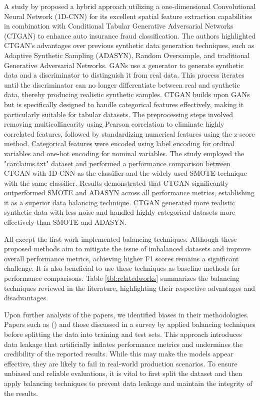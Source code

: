 \documentclass[twoside,11pt]{article}
\begin{document}
A study by \cite{Wongpanti2024} proposed a hybrid approach utilizing a one-dimensional Convolutional Neural Network (1D-CNN) for its excellent spatial feature extraction capabilities in combination with Conditional Tabular Generative Adversarial Networks (CTGAN) to enhance auto insurance fraud classification. The authors highlighted CTGAN’s advantages over previous synthetic data generation techniques, such as Adaptive Synthetic Sampling (ADASYN), Random Oversample, and traditional Generative Adversarial Networks. GANs use a generator to generate synthetic data and a discriminator to distinguish it from real data. This process iterates until the discriminator can no longer differentiate between real and synthetic data, thereby producing realistic synthetic samples. CTGAN builds upon GANs but is specifically designed to handle categorical features effectively, making it particularly suitable for tabular datasets. The preprocessing steps involved removing multicollinearity using Pearson correlation to eliminate highly correlated features, followed by standardizing numerical features using the z-score method. Categorical features were encoded using label encoding for ordinal variables and one-hot encoding for nominal variables. The study employed the "carclaims.txt" dataset and performed a performance comparison between CTGAN with 1D-CNN as the classifier and the widely used SMOTE technique with the same classifier. Results demonstrated that CTGAN significantly outperformed SMOTE and ADASYN across all performance metrics, establishing it as a superior data balancing technique. CTGAN generated more realistic synthetic data with less noise and handled highly categorical datasets more effectively than SMOTE and ADASYN.

All except the first work implemented balancing techniques. Although these proposed methods aim to mitigate the issue of imbalanced datasets and improve overall performance metrics, achieving higher F1 scores remains a significant challenge. It is also beneficial to use these techniques as baseline methods for performance comparisons. Table \ref{tbl:relatedworks} summarizes the balancing techniques reviewed in the literature, highlighting their respective advantages and disadvantages.

Upon further analysis of the papers, we identified biases in their methodologies. Papers such as (\citealp{Harjai2019, Padhi2020}) and those discussed in a survey by \cite{schrijverAutomobileInsuranceFraud2024} applied balancing techniques before splitting the data into training and test sets. This approach introduces data leakage that artificially inflates performance metrics and undermines the credibility of the reported results. While this may make the models appear effective, they are likely to fail in real-world production scenarios. To ensure unbiased and reliable evaluations, it is vital to first split the dataset and then apply balancing techniques to prevent data leakage and maintain the integrity of the results. 
\end{document}
